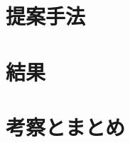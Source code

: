 \documentclass[a4paper, 11pt]{ltjsarticle}
\begin{document}
\section{提案手法}

\clearpage
\section{結果}

\clearpage
\section{考察とまとめ}

\clearpage
{}


\end{document}

